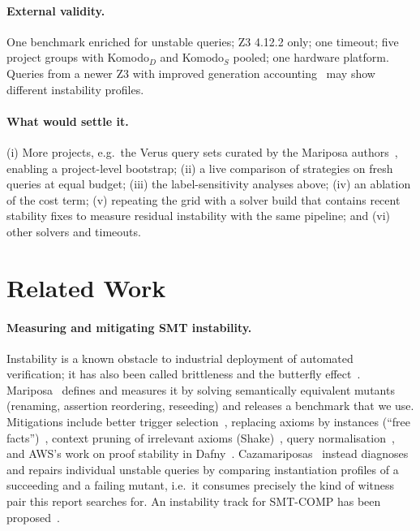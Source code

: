 \documentclass[11pt]{article}
\begin{document}
\paragraph{External validity.} One benchmark enriched for unstable queries; Z3 4.12.2 only; one timeout; five project groups with Komodo$_D$ and Komodo$_S$ pooled; one hardware platform. Queries from a newer Z3 with improved generation accounting~\cite{depth} may show different instability profiles.

\paragraph{What would settle it.} (i) More projects, e.g.\ the Verus query sets curated by the Mariposa authors~\cite{cazamariposas}, enabling a project-level bootstrap; (ii) a live comparison of strategies on fresh queries at equal budget; (iii) the label-sensitivity analyses above; (iv) an ablation of the cost term; (v) repeating the grid with a solver build that contains recent stability fixes to measure residual instability with the same pipeline; and (vi) other solvers and timeouts.

\section{Related Work}
\label{sec:related}

\paragraph{Measuring and mitigating SMT instability.}
Instability is a known obstacle to industrial deployment of automated verification; it has also been called brittleness and the butterfly effect~\cite{conjecture,aws}. Mariposa~\cite{mariposa} defines and measures it by solving semantically equivalent mutants (renaming, assertion reordering, reseeding) and releases a benchmark that we use. Mitigations include better trigger selection~\cite{trigger}, replacing axioms by instances (``free facts'')~\cite{freefacts}, context pruning of irrelevant axioms (Shake)~\cite{shake}, query normalisation~\cite{normalization}, and AWS's work on proof stability in Dafny~\cite{aws}. Cazamariposas~\cite{cazamariposas} instead diagnoses and repairs individual unstable queries by comparing instantiation profiles of a succeeding and a failing mutant, i.e.\ it consumes precisely the kind of witness pair this report searches for. An instability track for SMT-COMP has been proposed~\cite{track}.
\end{document}
